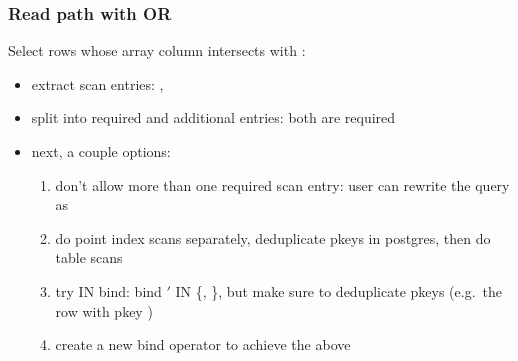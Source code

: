 \begin{frame}
  \frametitle{Read path with OR}
  Select rows whose array column intersects with :

  \pause

  \begin{itemize}
    \item extract scan entries: , 
      \pause
    \item split into required and additional entries: both are required
      \pause
    \item next, a couple options:
      \pause
      \begin{enumerate}
        \item don't allow more than one required scan entry: user can rewrite
          the query as 
          \pause
        \item do point index scans separately, deduplicate pkeys in postgres,
          then do table scans
          \pause
        \item try IN bind: bind $'$ IN \{,
          \}, but make sure to deduplicate pkeys (e.g.\ the row
          with pkey )
          \pause
        \item create a new bind operator to achieve the above
      \end{enumerate}
  \end{itemize}
\end{frame}
